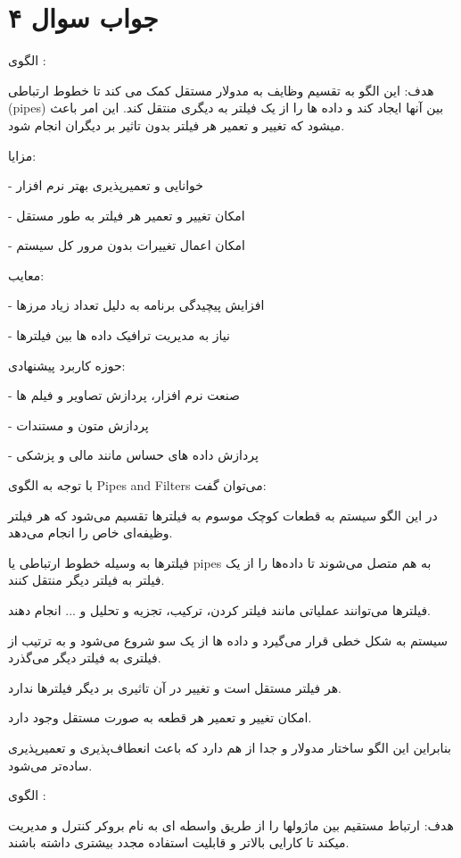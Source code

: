 \section*{جواب سوال ۴}

الگوی
 :

هدف:  
این الگو به تقسیم وظایف به مدولار مستقل کمک می کند تا خطوط ارتباطی (pipes) بین آنها ایجاد کند و داده ها را از یک فیلتر به دیگری منتقل کند. این امر باعث میشود که تغییر و تعمیر هر فیلتر بدون تاثیر بر دیگران انجام شود.

مزایا:

- خوانایی و تعمیرپذیری بهتر نرم افزار

- امکان تغییر و تعمیر هر فیلتر به طور مستقل

- امکان اعمال تغییرات بدون مرور کل سیستم


معایب:
 

- افزایش پیچیدگی برنامه به دلیل تعداد زیاد مرزها

- نیاز به مدیریت ترافیک داده ها بین فیلترها


حوزه کاربرد پیشنهادی:

- صنعت نرم افزار، پردازش تصاویر و فیلم ها

- پردازش متون و مستندات

- پردازش داده های حساس مانند مالی و پزشکی


با توجه به الگوی Pipes and Filters می‌توان گفت:

در این الگو سیستم به قطعات کوچک موسوم به فیلترها تقسیم می‌شود که هر فیلتر وظیفه‌ای خاص را انجام می‌دهد.

فیلترها به وسیله خطوط ارتباطی یا pipes به هم متصل می‌شوند تا داده‌ها را از یک فیلتر به فیلتر دیگر منتقل کنند.

فیلترها می‌توانند عملیاتی مانند فیلتر کردن، ترکیب، تجزیه و تحلیل و ... انجام دهند.

سیستم به شکل خطی قرار می‌گیرد و داده ها از یک سو شروع می‌شود و به ترتیب از فیلتری به فیلتر دیگر می‌گذرد.

هر فیلتر مستقل است و تغییر در آن تاثیری بر دیگر فیلترها ندارد.

امکان تغییر و تعمیر هر قطعه به صورت مستقل وجود دارد.

بنابراین این الگو ساختار مدولار و جدا از هم دارد که باعث انعطاف‌پذیری و تعمیرپذیری ساده‌تر می‌شود.

\newpage

الگوی
 :

هدف:
ارتباط مستقیم بین ماژولها را از طریق واسطه ای به نام بروکر کنترل و مدیریت میکند تا کارایی بالاتر و قابلیت استفاده مجدد بیشتری داشته باشند.

